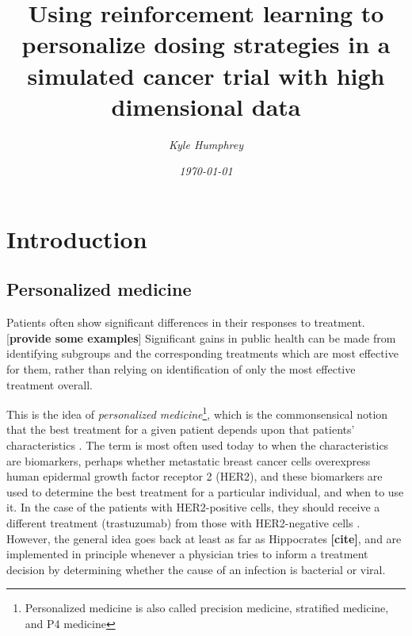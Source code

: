 \documentclass[12pt]{article}
\title{\normalfont \Large Using reinforcement learning to personalize dosing strategies in a simulated cancer trial with high dimensional data}
\author{\normalsize \sl Kyle Humphrey}
\date{\normalsize \sl \today}
\begin{document}
\maketitle

\tableofcontents
\listoffigures
\listoftables

\section{Introduction}

\subsection{Personalized medicine} %
\label{sub:personalized_medicine}


Patients often show significant differences in their responses to treatment. [\textbf{provide some examples}] Significant gains in public health can be made from identifying subgroups and the corresponding treatments which are most effective for them, rather than relying on identification of only the most effective treatment overall.


This is the idea of \emph{personalized medicine}\footnote{Personalized medicine is also called precision medicine, stratified medicine, and P4 medicine}, which is the commonsensical notion that the best treatment for a given patient depends upon that patients' characteristics \cite{defn-paper}. The term is most often used today to when the characteristics are biomarkers, perhaps whether metastatic breast cancer cells  overexpress human epidermal growth factor receptor 2 (HER2), and these biomarkers are used to determine the best treatment for a particular individual, and when to use it. In the case of the patients with HER2-positive cells, they should receive a different treatment (trastuzumab) from those with HER2-negative cells \cite{} .
However, the general idea goes back at least as far as Hippocrates \textbf{[cite]}, and are implemented in principle whenever a physician tries to inform a treatment decision by determining whether the cause of an infection is bacterial or viral.



\end{document}
